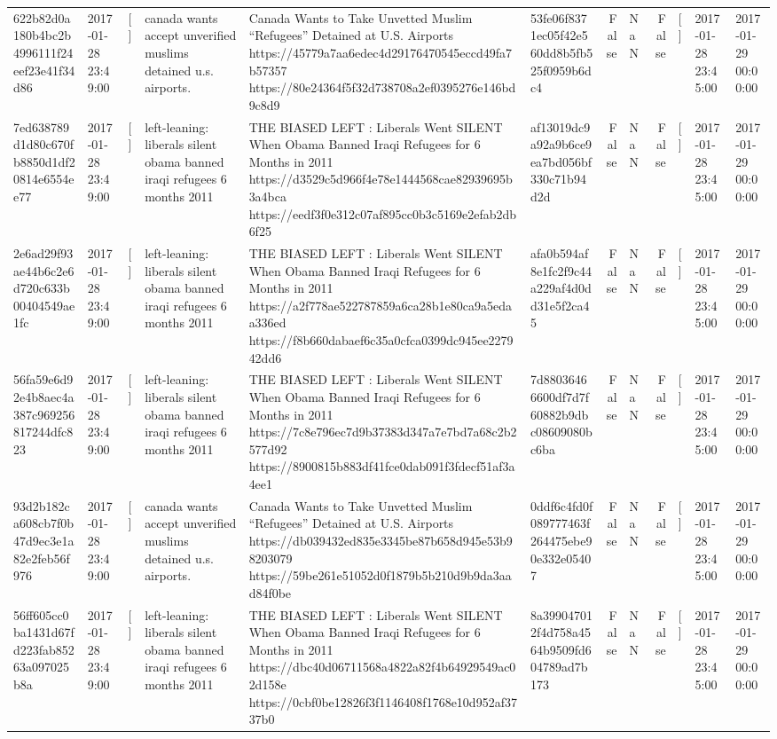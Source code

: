 \begin{tabular}{llllllrlrlll}
622b82d0a180b4bc2b4996111f24eef23e41f34d86 & 2017-01-28 23:49:00 & [] & canada wants accept unverified muslims detained u.s. airports. & Canada Wants to Take Unvetted Muslim “Refugees” Detained at U.S. Airports https://45779a7aa6edec4d29176470545eccd49fa7b57357 https://80e24364f5f32d738708a2ef0395276e146bd9c8d9 & 53fe06f8371ec05f42e560dd8b5fb525f0959b6dc4 & False & NaN & False & [] & 2017-01-28 23:45:00 & 2017-01-29 00:00:00 \\
7ed638789d1d80c670fb8850d1df20814e6554ee77 & 2017-01-28 23:49:00 & [] & left-leaning: liberals silent obama banned iraqi refugees 6 months 2011 & THE BIASED LEFT : Liberals Went SILENT When Obama Banned Iraqi Refugees for 6 Months in 2011 https://d3529c5d966f4e78e1444568cae82939695b3a4bca https://eedf3f0e312c07af895cc0b3c5169e2efab2db6f25 & af13019dc9a92a9b6ce9ea7bd056bf330c71b94d2d & False & NaN & False & [] & 2017-01-28 23:45:00 & 2017-01-29 00:00:00 \\
2e6ad29f93ae44b6c2e6d720c633b00404549ae1fc & 2017-01-28 23:49:00 & [] & left-leaning: liberals silent obama banned iraqi refugees 6 months 2011 & THE BIASED LEFT : Liberals Went SILENT When Obama Banned Iraqi Refugees for 6 Months in 2011 https://a2f778ae522787859a6ca28b1e80ca9a5edaa336ed https://f8b660dabaef6c35a0cfca0399dc945ee227942dd6 & afa0b594af8e1fc2f9c44a229af4d0dd31e5f2ca45 & False & NaN & False & [] & 2017-01-28 23:45:00 & 2017-01-29 00:00:00 \\
56fa59e6d92e4b8aec4a387c969256817244dfc823 & 2017-01-28 23:49:00 & [] & left-leaning: liberals silent obama banned iraqi refugees 6 months 2011 & THE BIASED LEFT : Liberals Went SILENT When Obama Banned Iraqi Refugees for 6 Months in 2011 https://7c8e796ec7d9b37383d347a7e7bd7a68c2b2577d92 https://8900815b883df41fce0dab091f3fdecf51af3a4ee1 & 7d88036466600df7d7f60882b9dbc08609080bc6ba & False & NaN & False & [] & 2017-01-28 23:45:00 & 2017-01-29 00:00:00 \\
93d2b182ca608cb7f0b47d9ec3e1a82e2feb56f976 & 2017-01-28 23:49:00 & [] & canada wants accept unverified muslims detained u.s. airports. & Canada Wants to Take Unvetted Muslim “Refugees” Detained at U.S. Airports https://db039432ed835e3345be87b658d945e53b98203079 https://59be261e51052d0f1879b5b210d9b9da3aad84f0be & 0ddf6c4fd0f089777463f264475ebe90e332e05407 & False & NaN & False & [] & 2017-01-28 23:45:00 & 2017-01-29 00:00:00 \\
56ff605cc0ba1431d67fd223fab85263a097025b8a & 2017-01-28 23:49:00 & [] & left-leaning: liberals silent obama banned iraqi refugees 6 months 2011 & THE BIASED LEFT : Liberals Went SILENT When Obama Banned Iraqi Refugees for 6 Months in 2011 https://dbc40d06711568a4822a82f4b64929549ac02d158e https://0cbf0be12826f3f1146408f1768e10d952af3737b0 & 8a399047012f4d758a4564b9509fd604789ad7b173 & False & NaN & False & [] & 2017-01-28 23:45:00 & 2017-01-29 00:00:00 \\

\end{tabular}
